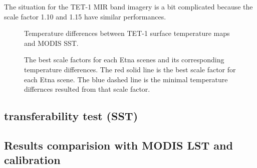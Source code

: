\noindent The situation for the TET-1 MIR band imagery is a bit complicated because the scale factor 1.10 and 1.15 have similar performances.\\

\begin{figure}[!htbp]
\centering
{}
\hspace{0.5in}
\caption{Temperature differences between TET-1 surface temperature maps and MODIS SST.}
\label{fig:etna_sc_mir_tir}
\end{figure}

\begin{figure}[!htbp]
\centering
{}
\hspace{0.5in}
\caption{The best scale factors for each Etna scenes and its corresponding temperature differences. The red solid line is the best scale factor for each Etna scene. The blue dashed line is the minimal temperature differnces resulted from that scale factor.}
\label{fig:etna_bsc_tem}
\end{figure}





\subsection{transferability test (SST)}


\subsection{Results comparision with MODIS LST and calibration}

